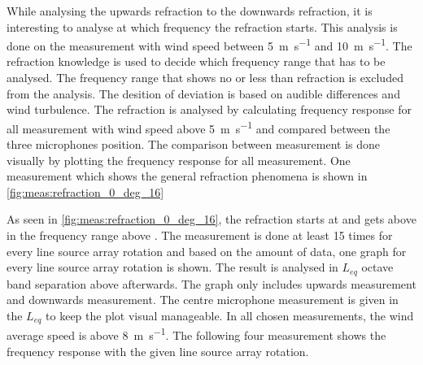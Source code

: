 


While analysing the upwards refraction to the downwards refraction, it is interesting to analyse at which frequency the refraction starts. This analysis is done on the measurement with wind speed between \SI{5}{\meter\per\second} and \SI{10}{\meter\per\second}. The refraction knowledge is used to decide which frequency range that has to be analysed. The frequency range that shows no or less than  refraction is excluded from the analysis. The desition of  deviation is based on audible differences and wind turbulence. The refraction is analysed by calculating frequency response for all measurement with wind speed above \SI{5}{\meter\per\second} and compared between the three microphones position. The comparison between measurement is done visually by plotting the frequency response for all measurement. One measurement which shows the general refraction phenomena is shown in \autoref{fig:meas:refraction_0_deg_16}




As seen in \autoref{fig:meas:refraction_0_deg_16}, the refraction starts at  and gets above  in the frequency range above . The measurement is done at least 15 times for every line source array rotation and based on the amount of data, one graph for every line source array rotation is shown. The result is analysed in $L_{eq}$ octave band separation above  afterwards. The graph only includes upwards measurement and downwards measurement. The centre microphone measurement is given in the $L_{eq}$  to keep the plot visual manageable. In all chosen measurements, the wind average speed is above \SI{8}{\meter\per\second}. The following four measurement shows the frequency response with the given line source array rotation.

